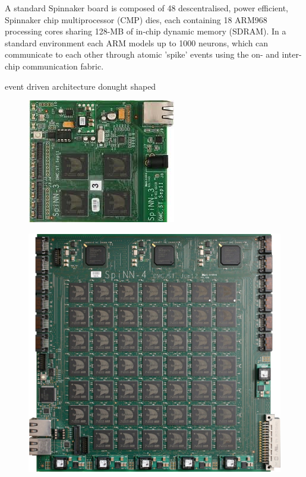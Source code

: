 A standard Spinnaker board is composed of 48 descentralised, power efficient, Spinnaker chip multiprocessor (CMP) dies, each containing 18 ARM968 processing cores sharing 128-MB of in-chip dynamic memory (SDRAM). In a standard environment each ARM models up to 1000 neurons, which can communicate to each other through atomic 'spike' events using the on- and inter-chip communication fabric.\cite{datasheet}

event driven architecture
donught shaped

\begin{figure}
\centering
\begin{minipage}{.5\textwidth}
  \centering
  \includegraphics[width=0.4\linewidth, natwidth=245, natheight=205]{images/4node.jpg}
  \label{fig:4node}
\end{minipage}%
\begin{minipage}{.5\textwidth}
  \centering
  \includegraphics[width=0.9\linewidth, natwidth=945, natheight=896]{images/48node.jpg}
  \label{fig:48node}
\end{minipage}
\end{figure}

